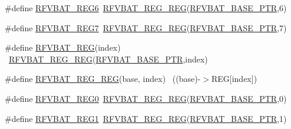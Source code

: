 \begin{DoxyCompactItemize}
\item 
\#define \hyperlink{group___r_f_v_b_a_t___register___accessor___macros_ga8f932612a87a5a7e302b4990c3880b03}{R\+F\+V\+B\+A\+T\+\_\+\+R\+E\+G6}~\hyperlink{group___r_f_v_b_a_t___register___accessor___macros_ga8c8b6cb4ceddcf6be9717e473a265aba}{R\+F\+V\+B\+A\+T\+\_\+\+R\+E\+G\+\_\+\+R\+EG}(\hyperlink{group___r_f_v_b_a_t___peripheral_ga5b6418d9be20f84b2190ccf6134b7ba3}{R\+F\+V\+B\+A\+T\+\_\+\+B\+A\+S\+E\+\_\+\+P\+TR},6)
\item 
\#define \hyperlink{group___r_f_v_b_a_t___register___accessor___macros_gadfbd3389e8e352e6fa869c5637131038}{R\+F\+V\+B\+A\+T\+\_\+\+R\+E\+G7}~\hyperlink{group___r_f_v_b_a_t___register___accessor___macros_ga8c8b6cb4ceddcf6be9717e473a265aba}{R\+F\+V\+B\+A\+T\+\_\+\+R\+E\+G\+\_\+\+R\+EG}(\hyperlink{group___r_f_v_b_a_t___peripheral_ga5b6418d9be20f84b2190ccf6134b7ba3}{R\+F\+V\+B\+A\+T\+\_\+\+B\+A\+S\+E\+\_\+\+P\+TR},7)
\item 
\#define \hyperlink{group___r_f_v_b_a_t___register___accessor___macros_ga73d57e05c3f341bac06fd7fdc7adb216}{R\+F\+V\+B\+A\+T\+\_\+\+R\+EG}(index)                                            ~\hyperlink{group___r_f_v_b_a_t___register___accessor___macros_ga8c8b6cb4ceddcf6be9717e473a265aba}{R\+F\+V\+B\+A\+T\+\_\+\+R\+E\+G\+\_\+\+R\+EG}(\hyperlink{group___r_f_v_b_a_t___peripheral_ga5b6418d9be20f84b2190ccf6134b7ba3}{R\+F\+V\+B\+A\+T\+\_\+\+B\+A\+S\+E\+\_\+\+P\+TR},index)
\item 
\#define \hyperlink{group___r_f_v_b_a_t___register___accessor___macros_ga8c8b6cb4ceddcf6be9717e473a265aba}{R\+F\+V\+B\+A\+T\+\_\+\+R\+E\+G\+\_\+\+R\+EG}(base,  index)                          ~((base)-\/$>$R\+EG\mbox{[}index\mbox{]})
\item 
\#define \hyperlink{group___r_f_v_b_a_t___register___accessor___macros_gab2c2deaa663210dcbe5b3c7c9dd3c279}{R\+F\+V\+B\+A\+T\+\_\+\+R\+E\+G0}~\hyperlink{group___r_f_v_b_a_t___register___accessor___macros_ga8c8b6cb4ceddcf6be9717e473a265aba}{R\+F\+V\+B\+A\+T\+\_\+\+R\+E\+G\+\_\+\+R\+EG}(\hyperlink{group___r_f_v_b_a_t___peripheral_ga5b6418d9be20f84b2190ccf6134b7ba3}{R\+F\+V\+B\+A\+T\+\_\+\+B\+A\+S\+E\+\_\+\+P\+TR},0)
\item 
\#define \hyperlink{group___r_f_v_b_a_t___register___accessor___macros_gaad1d344fc43c23927596453cbbfbe87f}{R\+F\+V\+B\+A\+T\+\_\+\+R\+E\+G1}~\hyperlink{group___r_f_v_b_a_t___register___accessor___macros_ga8c8b6cb4ceddcf6be9717e473a265aba}{R\+F\+V\+B\+A\+T\+\_\+\+R\+E\+G\+\_\+\+R\+EG}(\hyperlink{group___r_f_v_b_a_t___peripheral_ga5b6418d9be20f84b2190ccf6134b7ba3}{R\+F\+V\+B\+A\+T\+\_\+\+B\+A\+S\+E\+\_\+\+P\+TR},1)

\end{DoxyCompactItemize}
